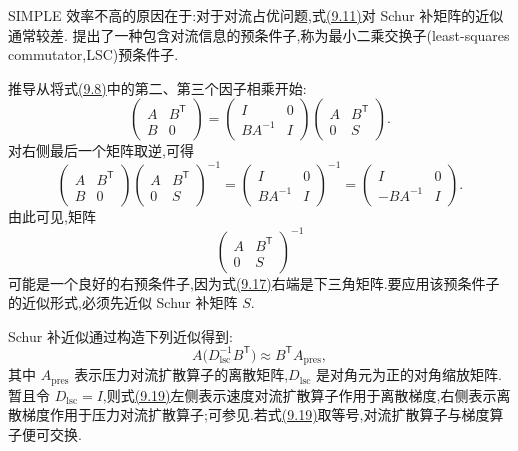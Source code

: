 \begin{example}
\label{ex:chapter9-lsc-preconditioner}
SIMPLE 效率不高的原因在于:对于对流占优问题,式\hyperref[eq:chapter9-simple-schur]{(9.11)}对 Schur 补矩阵的近似通常较差.\textcite{Elman2006} 提出了一种包含对流信息的预条件子,称为最小二乘交换子(least-squares commutator,LSC)预条件子.

推导从将式\hyperref[eq:chapter9-system-factorization]{(9.8)}中的第二、第三个因子相乘开始:
\[
\begin{pmatrix}A&B^{\mathsf T}\\B&0\end{pmatrix}
=\begin{pmatrix}I&0\\BA^{-1}&I\end{pmatrix}
 \begin{pmatrix}A&B^{\mathsf T}\\0&S\end{pmatrix}.
\]
对右侧最后一个矩阵取逆,可得
\begin{equation}\label{eq:chapter9-lsc-factorization}
\begin{pmatrix}A&B^{\mathsf T}\\B&0\end{pmatrix}
\begin{pmatrix}A&B^{\mathsf T}\\0&S\end{pmatrix}^{-1}
=\begin{pmatrix}I&0\\BA^{-1}&I\end{pmatrix}^{-1}
=\begin{pmatrix}I&0\\-BA^{-1}&I\end{pmatrix}.
\end{equation}
由此可见,矩阵
\begin{equation}\label{eq:chapter9-lsc-preconditioner-form}
\begin{pmatrix}A&B^{\mathsf T}\\0&S\end{pmatrix}^{-1}
\end{equation}
可能是一个良好的右预条件子,因为式\hyperref[eq:chapter9-lsc-factorization]{(9.17)}右端是下三角矩阵.要应用该预条件子的近似形式,必须先近似 Schur 补矩阵 $S$.

Schur 补近似通过构造下列近似得到:
\begin{equation}\label{eq:chapter9-lsc-commutator}
A\bigl(D_{\mathrm{lsc}}^{-1}B^{\mathsf T}\bigr)\approx B^{\mathsf T}A_{\mathrm{pres}},
\end{equation}
其中 $A_{\mathrm{pres}}$ 表示压力对流扩散算子的离散矩阵,$D_{\mathrm{lsc}}$ 是对角元为正的对角缩放矩阵.暂且令 $D_{\mathrm{lsc}}=I$,则式\hyperref[eq:chapter9-lsc-commutator]{(9.19)}左侧表示速度对流扩散算子作用于离散梯度,右侧表示离散梯度作用于压力对流扩散算子;可参见\textcite[第 9.2.3 节]{Elman2014}.若式\hyperref[eq:chapter9-lsc-commutator]{(9.19)}取等号,对流扩散算子与梯度算子便可交换.


\end{example}
